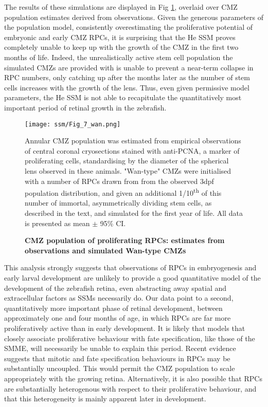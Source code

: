 The results of these simulations are displayed in Fig \ref{WanSim}, overlaid over CMZ population estimates derived from observations. Given the generous parameters of the population model, consistently overestimating the proliferative potential of embryonic and early CMZ RPCs, it is surprising that the He SSM proves completely unable to keep up with the growth of the CMZ in the first two months of life. Indeed, the unrealistically active stem cell population the simulated CMZs are provided with is unable to prevent a near-term collapse in RPC numbers, only catching up after the months later as the number of stem cells increases with the growth of the lens. Thus, even given permissive model parameters, the He SSM is not able to recapitulate the quantitatively most important period of retinal growth in the zebrafish.

\begin{figure}[!h]
\texttt{[image: ssm/Fig\_7\_wan.png]}   
\caption{{\bf CMZ population of proliferating RPCs: estimates from observations and simulated Wan-type CMZs}}
Annular CMZ population was estimated from empirical observations of central coronal cryosections stained with anti-PCNA, a marker of proliferating cells, standardising by the diameter of the spherical lens observed in these animals. "Wan-type" CMZs were initialised with a number of RPCs drawn from from the observed 3dpf population distribution, and given an additional 1/10\textsuperscript{th} of this number of immortal, asymmetrically dividing stem cells, as described in the text, and simulated for the first year of life. All data is presented as mean $\pm$ 95\% CI.
\label{WanSim}
\end{figure}

This analysis strongly suggests that observations of RPCs in embryogenesis and early larval development are unlikely to provide a good quantitative model of the development of the zebrafish retina, even abstracting away spatial and extracellular factors as SSMs necessarily do. Our data point to a second, quantitatively more important phase of retinal development, between approximately one and four months of age, in which RPCs are far more proliferatively active than in early development. It is likely that models that closely associate proliferative behaviour with fate specification, like those of the SMME, will necessarily be unable to explain this period. Recent evidence suggests that mitotic and fate specification behaviours in RPCs may be substantially uncoupled\cite{Engerer2017}. This would permit the CMZ population to scale appropriately with the growing retina. Alternatively, it is also possible that RPCs are substantially heterogenous with respect to their proliferative behaviour, and that this heterogeneity is mainly apparent later in development.

